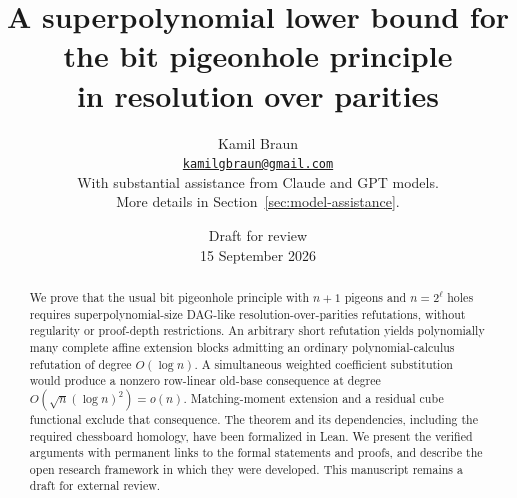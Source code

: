 \documentclass[11pt]{article}
\title{A superpolynomial lower bound for the bit pigeonhole principle\\
in resolution over parities}
\author{Kamil Braun\\
\href{mailto:kamilgbraun@gmail.com}{\texttt{kamilgbraun@gmail.com}}\\[0.6em]
\small With substantial assistance from Claude and GPT models.\\
\small More details in Section~\ref{sec:model-assistance}.}
\date{Draft for review\\15 September 2026}
\theoremstyle{definition}
\theoremstyle{remark}
\numberwithin{equation}{section}
\begin{document}
\maketitle
\begin{abstract}
We prove that the usual bit pigeonhole principle with \(n+1\) pigeons and
\(n=2^\ell\) holes requires superpolynomial-size DAG-like resolution-over-parities
refutations, without regularity or proof-depth restrictions. An arbitrary short
refutation yields polynomially many complete affine extension blocks admitting
an ordinary polynomial-calculus refutation of degree \(O(\log n)\).
A simultaneous weighted coefficient substitution would produce a nonzero
row-linear old-base consequence at degree \(O(\sqrt n(\log n)^2)=o(n)\).
Matching-moment extension and a residual cube functional exclude that consequence.
The theorem and its dependencies, including the required chessboard homology,
have been formalized in Lean. We present the verified arguments with permanent links to the formal statements and proofs, and describe
the open research framework in which they were developed. This manuscript
remains a draft for external review.
\end{abstract}
\clearpage
\tableofcontents
\newpage







\appendix


\end{document}

